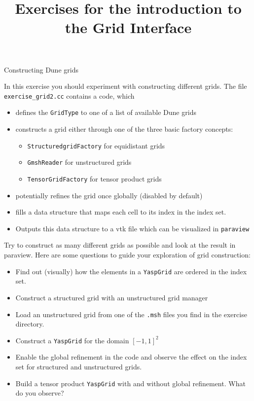 \documentclass[12pt,a4paper]{article}
\title{\textbf{Exercises for the introduction to the Grid Interface}}
\begin{document}
\exerciseheader

\begin{Exercise}{Constructing Dune grids}

In this exercise you should experiment with constructing different grids. The file
\lstinline!exercise_grid2.cc! contains a code, which
\begin{itemize}
 \item defines the \lstinline!GridType! to one of a list of available Dune grids
 \item constructs a grid either through one of the three basic factory concepts:
  \begin{itemize}
   \item \lstinline!StructuredgridFactory! for equidistant grids
   \item \lstinline!GmshReader! for unstructured grids
   \item \lstinline!TensorGridFactory! for tensor product grids
  \end{itemize}
 \item potentially refines the grid once globally (disabled by default)
 \item fills a data structure that maps each cell to its index in the index set.
 \item Outputs this data structure to a vtk file which can be visualized in \lstinline!paraview!
\end{itemize}

Try to construct as many different grids as possible and look at the result in paraview.
Here are some questions to guide your exploration of grid construction:
\begin{itemize}
 \item Find out (visually) how the elements in a \lstinline!YaspGrid! are ordered in the index set.
 \item Construct a structured grid with an unstructured grid manager
 \item Load an unstructured grid from one of the \lstinline!.msh! files you find in the exercise directory.
 \item Construct a \lstinline!YaspGrid! for the domain $[-1,1]^2$
 \item Enable the global refinement in the code and observe the effect on the index set for structured and unstructured grids.
 \item Build a tensor product \lstinline!YaspGrid! with and without global refinement. What do you observe?
\end{itemize}

\end{Exercise}
\end{document}
